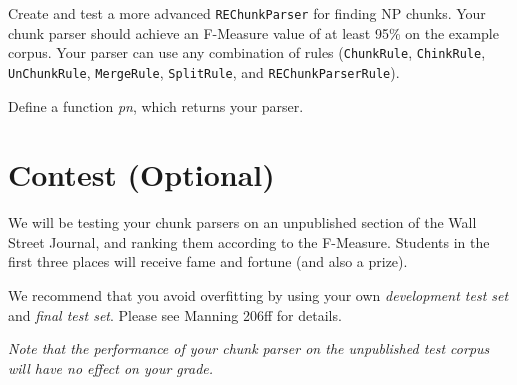 \documentclass{cis530}
\begin{document}
  Create and test a more advanced \texttt{REChunkParser} for finding
  NP chunks.  Your chunk parser should achieve an F-Measure value of
  at least 95\% on the example corpus.  Your parser can use any
  combination of rules (\texttt{ChunkRule}, \texttt{ChinkRule},
  \texttt{UnChunkRule}, \texttt{MergeRule}, \texttt{SplitRule}, and
  \texttt{REChunkParserRule}).

  Define a function \textit{pn}, which returns your parser.

\section{Contest (Optional)}

  We will be testing your chunk parsers on an unpublished section of
  the Wall Street Journal, and ranking them according to the
  F-Measure.  Students in the first three places will receive fame
  and fortune (and also a prize).

  We recommend that you avoid overfitting by using your own
  \emph{development test set} and \emph{final test set}.
  Please see Manning 206ff for details.

  \emph{Note that the performance of your chunk parser on the unpublished
  test corpus will have no effect on your grade.}
\end{document}
